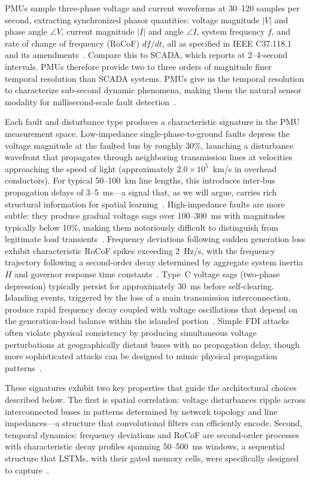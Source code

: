 \documentclass[journal]{IEEEtran}
\begin{document}
PMUs sample three-phase voltage and current waveforms at 30--120 samples per second, extracting synchronized phasor quantities: voltage magnitude $|V|$ and phase angle $\angle V$, current magnitude $|I|$ and angle $\angle I$, system frequency $f$, and rate of change of frequency (RoCoF) $df/dt$, all as specified in IEEE C37.118.1 and its amendments~\cite{ref4}. Compare this to SCADA, which reports at 2--4-second intervals. PMUs therefore provide two to three orders of magnitude finer temporal resolution than SCADA systems. PMUs give us the temporal resolution to characterize sub-second dynamic phenomena, making them the natural sensor modality for millisecond-scale fault detection~\cite{ref16}.

Each fault and disturbance type produces a characteristic signature in the PMU measurement space. Low-impedance single-phase-to-ground faults depress the voltage magnitude at the faulted bus by roughly 30\%, launching a disturbance wavefront that propagates through neighboring transmission lines at velocities approaching the speed of light (approximately $2.0\!\times\!10^5$~km/s in overhead conductors). For typical 50--100~km line lengths, this introduces inter-bus propagation delays of 3--5~ms---a signal that, as we will argue, carries rich structural information for spatial learning~\cite{ref17}. High-impedance faults are more subtle: they produce gradual voltage sags over 100--300~ms with magnitudes typically below 10\%, making them notoriously difficult to distinguish from legitimate load transients~\cite{ref18}. Frequency deviations following sudden generation loss exhibit characteristic RoCoF spikes exceeding 2~Hz/s, with the frequency trajectory following a second-order decay determined by aggregate system inertia $H$ and governor response time constants~\cite{ref19}. Type~C voltage sags (two-phase depression) typically persist for approximately 30~ms before self-clearing. Islanding events, triggered by the loss of a main transmission interconnection, produce rapid frequency decay coupled with voltage oscillations that depend on the generation-load balance within the islanded portion~\cite{ref20}. Simple FDI attacks often violate physical consistency by producing simultaneous voltage perturbations at geographically distant buses with no propagation delay, though more sophisticated attacks can be designed to mimic physical propagation patterns~\cite{ref13}.

These signatures exhibit two key properties that guide the architectural choices described below. The first is spatial correlation: voltage disturbances ripple across interconnected buses in patterns determined by network topology and line impedances---a structure that convolutional filters can efficiently encode. Second, temporal dynamics: frequency deviations and RoCoF are second-order processes with characteristic decay profiles spanning 50--500~ms windows, a sequential structure that LSTMs, with their gated memory cells, were specifically designed to capture~\cite{ref10,ref21}.
\end{document}
